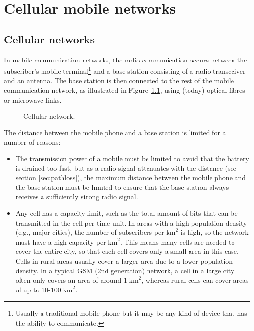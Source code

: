 \clearpage\chapter{Cellular mobile networks}

\section{Cellular networks}\label{sec:cellularnetworks}
In mobile communication networks, the radio communication occurs between the subscriber's mobile terminal\footnote{Usually a traditional mobile phone but it may be any kind of device that has the ability to communicate.} and a base station consisting of a radio transceiver and an antenna. The base station is then connected to the rest of the mobile communication network, as illustrated in Figure~\ref{fig:ms_and_basestation}, using (today) optical fibres or microwave links. 

\begin{figure}[htbp]
\centering
{}
\captionsetup{format=hang,margin=2cm}
\caption{\label{fig:ms_and_basestation}Cellular network.}
\end{figure}

The distance between the mobile phone and a base station is limited for a number of reasons:

\begin{itemize}
%
\item The transmission power of a mobile must be limited to avoid that the battery is drained too fast, but as a radio signal attenuates with the distance (see section \ref{sec:pathloss}), the maximum distance between the mobile phone and the base station must be limited to ensure that the base station always receives a sufficiently strong radio signal.
%
\item Any cell has a capacity limit, such as the total amount of bits that can be transmitted in the cell per time unit. In areas with a high population density (e.g., major cities), the number of subscribers per $\textrm{km}^2$ is high, so the network must have a high capacity per $\textrm{km}^2$.  This means many cells are needed to cover the entire city, so that each cell covers only a small area in this case. Cells in rural areas usually cover a larger area due to a lower population density. In a typical GSM (2nd generation) network, a cell in a large city often only covers an area of around 1 $\textrm{km}^2$, whereas rural cells can cover areas of up to 10-100$\textrm{ km}^2$.
%
\end{itemize}

